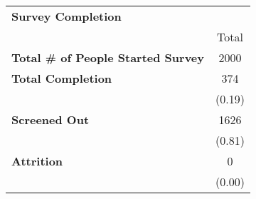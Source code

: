 \begin{tabular}{lc}
\toprule
\textbf{Survey Completion}\\
 & Total \\
\hline
\textbf{Total \# of People Started Survey} & 2000 \\
\addlinespace
\textbf{Total Completion} & 374 \\
 & (0.19) \\
\textbf{Screened Out} & 1626 \\
 & (0.81) \\
\textbf{Attrition} & 0  \\
 & (0.00) \\
\hline
\end{tabular}
